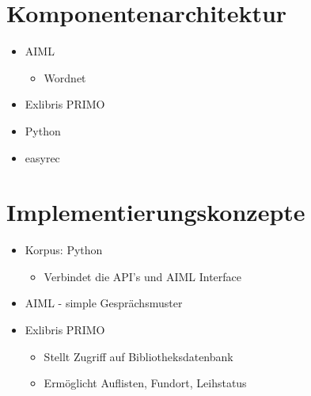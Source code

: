 \documentclass[9pt]{beamer}
\begin{document}
\section{Komponentenarchitektur}
\begin{frame}
  \begin{itemize}
    \item AIML
    \begin{itemize}
      \item Wordnet
    \end{itemize}
    \item Exlibris PRIMO
    \item Python
    \item easyrec
  \end{itemize}
\end{frame}

\section{Implementierungskonzepte}
\begin{frame}
  \begin{itemize}
    \item Korpus: Python
    \begin{itemize}
      \item Verbindet die API's und AIML Interface
    \end{itemize}
    \item AIML - simple Gesprächsmuster
    \item Exlibris PRIMO
    \begin{itemize}
      \item Stellt Zugriff auf Bibliotheksdatenbank 
      \item Ermöglicht Auflisten, Fundort, Leihstatus
    \end{itemize}
  \end{itemize}
\end{frame}
\end{document}
